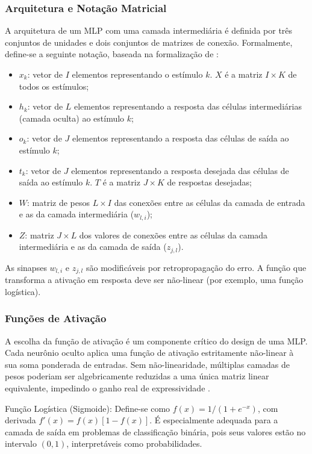 \subsubsection{Arquitetura e Notação Matricial}

A arquitetura de um MLP com uma camada intermediária é definida por três conjuntos de unidades e dois conjuntos de matrizes de conexão. Formalmente, define-se a seguinte notação, baseada na formalização de :

\begin{itemize}
    \item $x_k$: vetor de $I$ elementos representando o estímulo $k$. $X$ é a matriz $I \times K$ de todos os estímulos;
    \item $h_k$: vetor de $L$ elementos representando a resposta das células intermediárias (camada oculta) ao estímulo $k$;
    \item $o_k$: vetor de $J$ elementos representando a resposta das células de saída ao estímulo $k$;
    \item $t_k$: vetor de $J$ elementos representando a resposta desejada das células de saída ao estímulo $k$. $T$ é a matriz $J \times K$ de respostas desejadas;
    \item $W$: matriz de pesos $L \times I$ das conexões entre as células da camada de entrada e as da camada intermediária ($w_{l,i}$);
    \item $Z$: matriz $J \times L$ dos valores de conexões entre as células da camada intermediária e as da camada de saída ($z_{j,l}$).
\end{itemize}

As sinapses $w_{l,i}$ e $z_{j,l}$ são modificáveis por retropropagação do erro. A função que transforma a ativação em resposta deve ser não-linear (por exemplo, uma função logística).

\subsubsection{Funções de Ativação}

A escolha da função de ativação é um componente crítico do design de uma MLP. Cada neurônio oculto aplica uma função de ativação estritamente não-linear à sua soma ponderada de entradas. Sem não-linearidade, múltiplas camadas de pesos poderiam ser algebricamente reduzidas a uma única matriz linear equivalente, impedindo o ganho real de expressividade \cite{rand2006}.

Função Logística (Sigmoide): Define-se como $f(x) = 1/(1 + e^{-x})$, com derivada $f'(x) = f(x)[1 - f(x)]$. É especialmente adequada para a camada de saída em problemas de classificação binária, pois seus valores estão no intervalo $(0, 1)$, interpretáveis como probabilidades.

